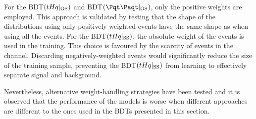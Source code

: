 For the BDT$(tHq|_{\text{OS}})$ and BDT$(\ttbar|_{\text{OS}})$, only the positive weights
are employed. This approach is validated by testing that the shape of the distributions
using only positively-weighted events have the same shape as when using all the events.
For the BDT$(tHq|_{\text{SS}})$, the absolute weight of the events is used in the training. 
This choice is favoured by the scarcity of events in the \dilepSStau channel. 
Discarding negatively-weighted events would significantly reduce the size of the training sample, 
preventing the BDT$(tHq|_{\text{SS}})$ from learning to effectively separate signal and background.


\begin{comment}
\begin{table}[h]
\centering
\begin{tabular}{l|cc|cc}
\cline{2-5}
         				& \multicolumn{2}{c}{All weights} & \multicolumn{2}{c}{Positive weights} \\
         				& All           & Target          & All             & Target             \\ \midrule
BDT$(\tHq|_{\text{OS}})$  &               &                 &                 &                    \\
BDT$(\ttbar|_{\text{OS}})$ &               &                 &                 &                    \\
BDT$(\tHq|_{\text{SS}})$   &               &                 &                 &                   \\ \bottomrule
\end{tabular}
\caption{Raw events entering the training of the BDTs depending on whether all the events are just or only those yielding positive weights. The raw yields are presented for the complete training sample and for the target process only.}
\label{tab:ChaptH:EventSelection:BDT:RawYields}
\end{table}
\end{comment}

Nevertheless, alternative weight-handling strategies have been tested and
it is observed that
the performance of the models is worse when different approaches are 
different to the ones used in the BDTs presented in this section.







